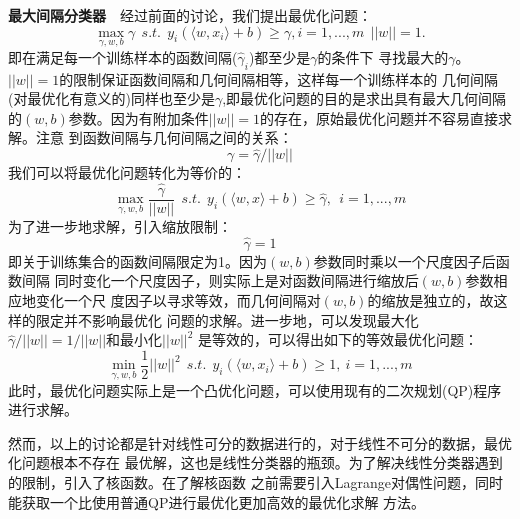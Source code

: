 \textbf{最大间隔分类器}~~经过前面的讨论，我们提出最优化问题：
\begin{equation}
    \max_{\gamma,w,b}\gamma~~s.t.~~y_i(\langle{}w,x_i\rangle+b)\geq\gamma,i=1,...,m
    ~~||w||=1.
\end{equation}
即在满足每一个训练样本的函数间隔($\hat{\gamma}_i$)都至少是$\gamma$的条件下
寻找最大的$\gamma$。$||w||=1$的限制保证函数间隔和几何间隔相等，这样每一个训练样本的
几何间隔(对最优化有意义的)同样也至少是$\gamma$,即最优化问题的目的是求出具有最大几何间隔
的$(w,b)$参数。因为有附加条件$||w||=1$的存在，原始最优化问题并不容易直接求解。注意
到函数间隔与几何间隔之间的关系：
\begin{equation}
    \gamma=\hat{\gamma}/||w||
\end{equation}
我们可以将最优化问题转化为等价的：
\begin{equation}
    \max_{\gamma,w,b}\frac{\hat{\gamma}}{||w||}~~s.t.~~y_i(\langle{}w,x\rangle+b)\geq
    \hat{\gamma},~~i=1,...,m
\end{equation}
为了进一步地求解，引入缩放限制：
\begin{equation}
    \hat{\gamma}=1
\end{equation}
即关于训练集合的函数间隔限定为1。因为$(w,b)$参数同时乘以一个尺度因子后函数间隔
同时变化一个尺度因子，则实际上是对函数间隔进行缩放后$(w,b)$参数相应地变化一个尺
度因子以寻求等效，而几何间隔对$(w,b)$的缩放是独立的，故这样的限定并不影响最优化
问题的求解。进一步地，可以发现最大化$\hat{\gamma}/||w||=1/||w||$和最小化$||w||^2$
是等效的，可以得出如下的等效最优化问题：
\begin{equation}
    \min_{\gamma,w,b}\frac{1}{2}||w||^2~~s.t.~~y_i(\langle{}w,x_i\rangle+b)\geq1,~i=1,...,m
\end{equation}
此时，最优化问题实际上是一个凸优化问题，可以使用现有的二次规划(QP)程序进行求解。

然而，以上的讨论都是针对线性可分的数据进行的，对于线性不可分的数据，最优化问题根本不存在
最优解，这也是线性分类器的瓶颈。为了解决线性分类器遇到的限制，引入了核函数。在了解核函数
之前需要引入Lagrange对偶性问题，同时能获取一个比使用普通QP进行最优化更加高效的最优化求解
方法。

